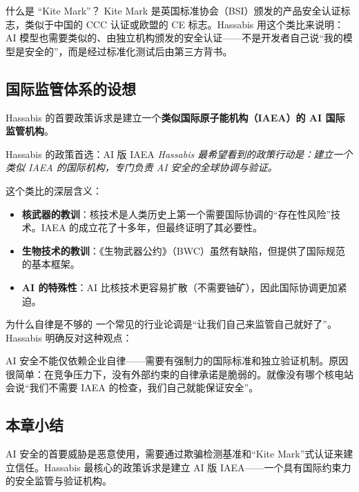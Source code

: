 \documentclass[a4paper]{article}
\begin{document}
\begin{knowledgebox}{什么是 ``Kite Mark''？}
Kite Mark 是英国标准协会（BSI）颁发的产品安全认证标志，类似于中国的 CCC 认证或欧盟的 CE 标志。Hassabis 用这个类比来说明：AI 模型也需要类似的、由独立机构颁发的安全认证——不是开发者自己说``我的模型是安全的''，而是经过标准化测试后由第三方背书。
\end{knowledgebox}

\subsection{国际监管体系的设想}

Hassabis 的首要政策诉求是建立一个\textbf{类似国际原子能机构（IAEA）的 AI 国际监管机构}。

\begin{importantbox}{Hassabis 的政策首选：AI 版 IAEA}
\textit{Hassabis 最希望看到的政策行动是：建立一个类似 IAEA 的国际机构，专门负责 AI 安全的全球协调与验证。}

这个类比的深层含义：
\begin{itemize}
    \item \textbf{核武器的教训}：核技术是人类历史上第一个需要国际协调的``存在性风险''技术。IAEA 的成立花了十多年，但最终证明了其必要性。
    \item \textbf{生物技术的教训}：《生物武器公约》（BWC）虽然有缺陷，但提供了国际规范的基本框架。
    \item \textbf{AI 的特殊性}：AI 比核技术更容易扩散（不需要铀矿），因此国际协调更加紧迫。
\end{itemize}
\end{importantbox}

\begin{warningbox}{为什么自律是不够的}
一个常见的行业论调是``让我们自己来监管自己就好了''。Hassabis 明确反对这种观点：

AI 安全不能仅依赖企业自律——需要有强制力的国际标准和独立验证机制。原因很简单：在竞争压力下，没有外部约束的自律承诺是脆弱的。就像没有哪个核电站会说``我们不需要 IAEA 的检查，我们自己就能保证安全''。
\end{warningbox}

\subsection{本章小结}

AI 安全的首要威胁是恶意使用，需要通过欺骗检测基准和``Kite Mark''式认证来建立信任。Hassabis 最核心的政策诉求是建立 AI 版 IAEA——一个具有国际约束力的安全监管与验证机构。
\end{document}
